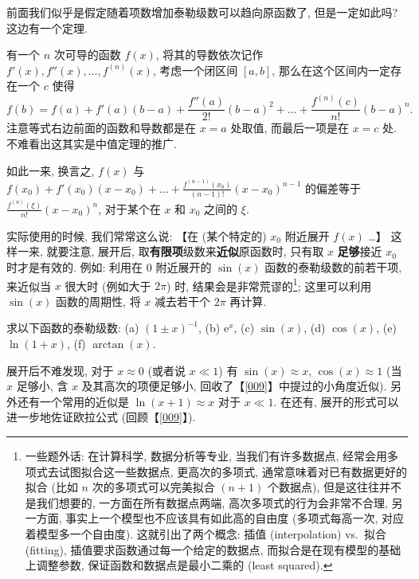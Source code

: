 \begin{tcolorbox}[size=fbox, breakable, enhanced jigsaw, title={泰勒级数 (Taylor Series)}]
\begin{tcolorbox}[size=fbox, breakable, enhanced jigsaw, title={收敛性}]
前面我们似乎是假定随着项数增加泰勒级数可以趋向原函数了, 但是一定如此吗?
这边有一个定理.

\begin{tcolorbox}[size=fbox, breakable, enhanced jigsaw, title={泰勒中值定理 (Taylor's Theorem)}]

有一个 $n$ 次可导的函数 $f(x)$, 将其的导数依次记作
$f'(x),f''(x),...,f^{(n)}(x)$, 考虑一个闭区间 $[a,b]$,
那么在这个区间内一定存在一个 $c$ 使得 \[
f(b)=f(a)+f'(a)(b-a)+\frac{f''(a)}{2!}(b-a)^2+...+\frac{f^{(n)}(c)}{n!}(b-a)^n.
\] 注意等式右边前面的函数和导数都是在 $x=a$ 处取值, 而最后一项是在
$x=c$ 处. 不难看出这其实是中值定理的推广.

如此一来, 换言之, $f(x)$ 与
$f(x_0)+f'(x_0)(x-x_0)+...+\frac{f^{(n-1)}(x_0)}{(n-1)!}(x-x_0)^{n-1}$
的偏差等于 $\frac{f^{(n)}(\xi)}{n!}(x-x_0)^n$, 对于某个在 $x$ 和
$x_0$ 之间的 $\xi$.

\end{tcolorbox}

实际使用的时候, 我们常常这么说: 【在 (某个特定的) $x_0$ 附近展开
$f(x)$ \ldots】 这样一来, 就要注意, 展开后,
取\textbf{有限项}级数来\textbf{近似}原函数时, 只有取 $x$
\textbf{足够}接近 $x_0$ 时才是有效的. 例如: 利用在 $0$ 附近展开的
$\sin(x)$ 函数的泰勒级数的前若干项, 来近似当 $x$ 很大时 (例如大于
$2\pi$) 时, 结果会是非常荒谬的\footnote{一些题外话: 在计算科学,
  数据分析等专业, 当我们有许多数据点,
  经常会用多项式去试图拟合这一些数据点, 更高次的多项式,
  通常意味着对已有数据更好的拟合 (比如 $n$ 次的多项式可以完美拟合
  $(n+1)$ 个数据点), 但是这往往并不是我们想要的,
  一方面在所有数据点两端, 高次多项式的行为会非常不合理, 另一方面,
  事实上一个模型也不应该具有如此高的自由度 (多项式每高一次,
  对应着模型多一个自由度). 这就引出了两个概念: 插值 (interpolation)
  vs.~拟合 (fitting), 插值要求函数通过每一个给定的数据点,
  而拟合是在现有模型的基础上调整参数, 保证函数和数据点是最小二乘的
  (least squared).}; 这里可以利用 $\sin(x)$ 函数的周期性, 将 $x$
减去若干个 $2\pi$ 再计算.

\end{tcolorbox}

\end{tcolorbox}

\begin{tcolorbox}[size=fbox, breakable, enhanced jigsaw, title={练习}]

求以下函数的泰勒级数: (a) $(1\pm x)^{-1}$, (b) $\mathrm{e}^x$, (c)
$\sin(x)$, (d) $\cos(x)$, (e) $\ln(1+x)$, (f) $\arctan(x)$.

展开后不难发现, 对于 $x\approx 0$ (或者说 $x\ll1$) 有
$\sin(x)\approx x$, $\cos(x)\approx 1$ (当 $x$ 足够小, 含 $x$
及其高次的项便足够小, 回收了【\ref{009}】中提过的小角度近似).
另外还有一个常用的近似是 $\ln(x+1)\approx x$ 对于 $x\ll 1$. 在还有,
展开的形式可以进一步地佐证欧拉公式 (回顾【\ref{009}】).

\end{tcolorbox}